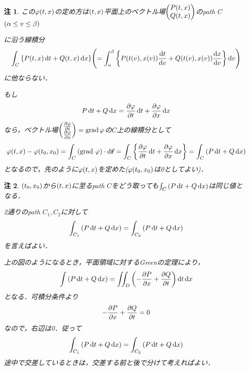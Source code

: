 \documentclass[autodetect-engine,dvipdfmx-if-dvi,ja=standard]{bxjsarticle}
\makeatletter
\theoremstyle{mystyle1}
\theoremstyle{mystyle2}
\newtheorem{note}{注}
\renewenvironment{proof}[1][\proofname]{\par
  \pushQED{\qed}%
  \normalfont
  \topsep6\p@\@plus6\p@ \trivlist
  \item[\hskip\labelsep{\bfseries\sffamily #1}]\ignorespaces
}{%
  \popQED\endtrivlist\@endpefalse
}
\renewcommand\proofname{\ensuremath{\because}}
\makeatother
\begin{document}
\begin{note}
  この$\varphi\qty(t,x)$の定め方は$\qty(t,x)$平面上のベクトル場$\mqty(
    P\qty(t,x) \\Q\qty(t,x)
    )$のpath $C$\,$\qty(\alpha\leq v\leq\beta)$に沿う線積分\begin{align*}\int_C\qty{P\qty(t,x)\dd{t}+Q\qty(t,x)\dd{x}}\qty(=\int_\alpha^\beta\qty{P\qty(t\qty(v),x\qty(v))\dv{t}{v}+Q\qty(t\qty(v),x\qty(v))\dv{x}{v}}\dd{v})\end{align*}に他ならない．

  もし\begin{align*}
    P\dd{t}+Q\dd{x}=\pdv{\varphi}{t}\dd{t}+\pdv{\varphi}{x}\dd{x}
  \end{align*}なら，ベクトル場$\mqty(
    \pdv{\varphi}{t} \\\pdv{\varphi}{x}
    )=\text{grad}\,\varphi$の$C$上の線積分として\begin{align*}
    \varphi\qty(t,x)-\varphi\qty(t_0,x_0)=\int_C\qty(\text{grad }\varphi)\cdot\dd{\va{r}}=\int_C\qty{\pdv{\varphi}{t}\dd{t}+\pdv{\varphi}{x}\dd{x}}=\int_C\qty(P\dd{t}+Q\dd{x})
  \end{align*}となるので，先のように$\varphi\qty(t,x)$を定めた($\varphi\qty(t_0,x_0)$は0としてよい)．
\end{note}
\begin{note}
  $\qty(t_0,x_0)$から$\qty(t,x)$に至るpath $C$をどう取っても$\int_C\qty(P\dd{t}+Q\dd{x})$は同じ値となる．
  \begin{proof}
    2通りのpath $C_1,C_2$に対して\begin{align*}
      \int_{C_1}\qty(P\dd{t}+Q\dd{x})=\int_{C_2}\qty(P\dd{t}+Q\dd{x})
    \end{align*}を言えばよい．\\
    上の図のようになるとき，平面領域に対するGreenの定理により，\begin{align*}
      \int\qty(P\dd{t}+Q\dd{x})=\iint_D\qty(-\pdv{P}{x}+\pdv{Q}{t})\dd{t}\dd{x}
    \end{align*}となる．可積分条件より\begin{align*}
      -\pdv{P}{x}+\pdv{Q}{t}=0
    \end{align*}なので，右辺は0．従って\begin{align*}
      \int_{C_1}\qty(P\dd{t}+Q\dd{x})=\int_{C_2}\qty(P\dd{t}+Q\dd{x})
    \end{align*}
    途中で交差しているときは，交差する前と後で分けて考えればよい．
  \end{proof}
\end{note}
\end{document}
